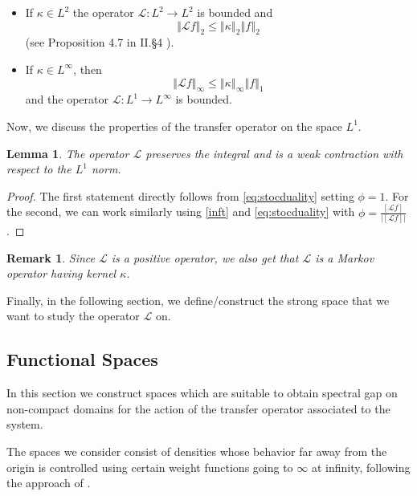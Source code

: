 \documentclass{amsart}
\newtheorem{lemma}[theorem]{Lemma}
\newtheorem{remark}[theorem]{Remark}
\newcommand\cL{{\mathcal L}}
\newcommand{\norm}[1]{\left\Vert#1\right\Vert}
\begin{document}
\begin{itemize}
\item If $\kappa\in L^2$ the operator $\cL:L^{2}\rightarrow L^{2}$ is bounded and  
\begin{equation}
\norm{\cL f}_{2}\leq \norm{\kappa}_{2}\norm{f}_{2}  \label{KF}
\end{equation}%
(see Proposition 4.7 in II.\S 4 \cite{C}).

\item If $\kappa\in L^{\infty}$, then 
\begin{equation}
\norm{\cL f}_{\infty }\leq \norm{\kappa}_{\infty }\norm{f}_{1}  \label{KF2}
\end{equation}
and the operator $\cL:L^1\rightarrow L^{\infty }$ is bounded.
\end{itemize}
Now, we discuss the properties of the transfer operator on the space \(L^1\).
\begin{lemma}\label{lem:contraction}
The operator $\cL$ preserves the integral and is a weak contraction with
respect to the $L^1$ norm.\label{7}
\end{lemma}

\begin{proof}
The first statement directly follows from \eqref{eq:stocduality} setting $%
\phi =1$. For the second, we can work similarly using \eqref{inft} and %
\eqref{eq:stocduality} with $\phi =\frac{[\cL f]}{|[\cL f]|}$.
\end{proof}

\begin{remark}\label{rem:Markov_op}
    Since $\cL$ is a positive operator, we also get that $\cL$ is a Markov operator having kernel $\kappa$.
\end{remark}

Finally, in the following section, we define/construct the strong space that we want to study the operator \(\cL\) on.
\subsection{Functional Spaces}\label{sec:spaces}

In this section we construct spaces which are  suitable to obtain spectral gap on non-compact domains for the action of the transfer operator associated to the system. 

 The spaces we consider consist of densities whose behavior far away from the origin is controlled using certain weight functions going to $\infty $ at infinity, following the approach of \cite{FGGV24}. 
 
\end{document}

